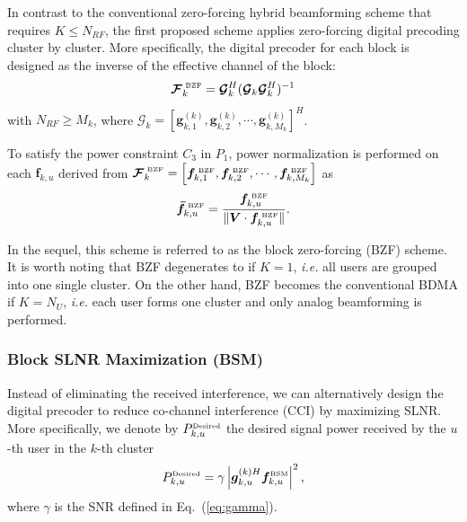 \documentclass[conference]{IEEEtran}
\begin{document}
{In contrast to the conventional zero-forcing hybrid beamforming scheme \cite{el2014spatially} that requires $K\leq N_{RF}$, the first proposed scheme applies zero-forcing digital precoding cluster by cluster. More specifically, the digital precoder for each block is designed as the inverse of the effective channel of the block:
\begin{equation}
\bm{\mathcal{F}}^{\tiny\mbox{ BZF}}_{k} = \bm{\mathcal{G}}_k^H (\bm{\mathcal{G}}_k \bm{\mathcal{G}}_k^H)^{-1}
\label{eq:Fbzf}
\end{equation}
with $N_{RF}\geq M_k$, where $\bm{\mathcal{G}}_k = [\bm{g}^{(k)}_{k,1}, \bm{g}^{(k)}_{k,2},\cdots,\bm{g}^{(k)}_{k,M_k}]^H$.

To satisfy the power constraint $C_3$ in $P_1$, power normalization is performed on each ${\bm f}_{k,u}$ derived from $\bm{\mathcal{F}}^{\tiny\mbox{ BZF}}_{k}=\left[\bm{f}^{\tiny\mbox{ BZF}}_{k,1},\bm{f}^{\tiny\mbox{ BZF}}_{k,2},\cdots,\bm{f}^{\tiny\mbox{ BZF}}_{k,M_k}\right]$ as
\begin{equation}\label{eq:ZFU-HBF2}
\bm{\bar{f}}^{\tiny\mbox{ BZF}}_{k,u} = \frac{\bm{f}^{\tiny\mbox{ BZF}}_{k,u}}{\|\bm{V}\cdot\bm{f}^{\tiny\mbox{ BZF}}_{k,u}\|}.
\end{equation}

In the sequel, this scheme is referred to as the block zero-forcing (BZF) scheme. It is worth noting that BZF degenerates to \cite{el2014spatially} if $K=1$, {\em i.e.} all users are grouped into one single cluster. On the other hand, BZF becomes the conventional BDMA if $K=N_U$, {\em i.e.} each user forms one cluster and only analog beamforming is performed.


\subsubsection{Block SLNR Maximization (BSM)}
Instead of eliminating the received interference, we can alternatively design the digital precoder to reduce co-channel interference (CCI) by maximizing SLNR. More specifically, we denote by $P^{\tiny\mbox{Desired}}_{k,u}$ the desired signal power received by the $u$-th user in the $k$-th cluster
\begin{equation}
P^{\tiny\mbox{Desired}}_{k,u} = \gamma\left|\bm{g}_{k,u}^{(k)H}  \bm{f}^{\tiny\mbox{BSM}}_{k,u}\right|^2,
\end{equation}
where $\gamma$ is the SNR defined in Eq.~(\ref{eq:gamma}).

}
\end{document}
